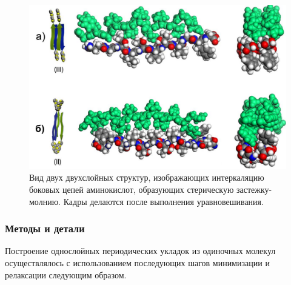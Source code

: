 \begin{figure} [H]
    \centering
    \includegraphics[width=\textwidth]{images/p4/punkt5/part4_p5_f34.pdf}
    \caption[Вид двух двухслойных структур, изображающих интеркаляцию боковых цепей аминокислот, образующих стерическую застежку-молнию]{Вид двух двухслойных структур, изображающих интеркаляцию боковых цепей аминокислот, образующих стерическую застежку-молнию. Кадры делаются после выполнения уравновешивания.}
    \label{fig:p4_p5_f34}
\end{figure}


\subsubsection{Методы и детали}

    Построение однослойных периодических укладок из одиночных молекул осуществлялось с использованием последующих шагов минимизации и релаксации следующим образом.


